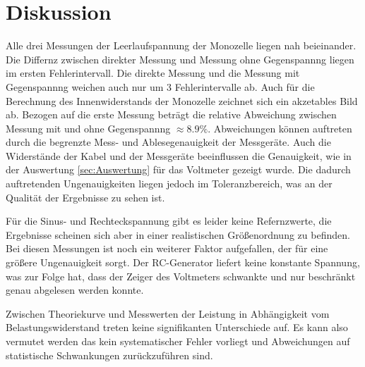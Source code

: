 \section{Diskussion}
\label{sec:Diskussion}

Alle drei Messungen der Leerlaufspannung der Monozelle liegen nah beieinander.
Die Differnz zwischen direkter Messung und Messung ohne Gegenspannng liegen im ersten Fehlerintervall.
Die direkte Messung und die Messung mit Gegenspannng weichen auch nur um 3 Fehlerintervalle ab.
Auch für die Berechnung des Innenwiderstands der Monozelle zeichnet sich ein akzetables Bild ab.
Bezogen auf die erste Messung beträgt die relative Abweichung zwischen Messung mit und ohne Gegenspannng $\approx 8.9 \%$.
Abweichungen können auftreten durch die begrenzte Mess- und Ablesegenauigkeit der Messgeräte.
Auch die Widerstände der Kabel  und der Messgeräte beeinflussen die Genauigkeit, wie in der Auswertung \ref{sec:Auswertung} für das Voltmeter gezeigt wurde.
Die dadurch auftretenden Ungenauigkeiten liegen jedoch im Toleranzbereich, was an der Qualität der Ergebnisse zu sehen ist.

Für die Sinus- und Rechteckspannung gibt es leider keine Refernzwerte, die Ergebnisse scheinen sich aber in einer realistischen Größenordnung zu befinden.
Bei diesen Messungen ist noch ein weiterer Faktor aufgefallen, der für eine größere Ungenauigkeit sorgt.
Der RC-Generator liefert keine konstante Spannung, was zur Folge hat, dass der Zeiger des Voltmeters schwankte und nur beschränkt genau abgelesen werden konnte.

Zwischen Theoriekurve und Messwerten der Leistung in Abhängigkeit vom Belastungswiderstand treten keine signifikanten Unterschiede auf.
Es kann also vermutet werden das kein systematischer Fehler vorliegt und Abweichungen auf statistische Schwankungen zurückzuführen sind.
